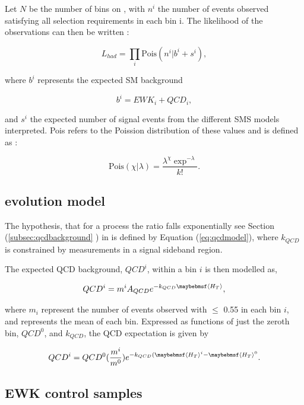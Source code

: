 Let $N$ be the number of bins on \theht, with $n^{i}$ the number of events observed satisfying all selection requirements in each \theht bin i. The likelihood of the observations can then be written :

\begin{equation}
L_{had} =   \prod_{i}\text{Pois}(n^{i}\rvert b^{i} + s^{i}),
\end{equation}

where $b^{i}$ represents the expected \ac{SM} background 

\begin{equation}
\label{eq:totbacksum}
b^{i} = EWK_{i} + QCD_{i},
\end{equation}

and $s^{i}$ the expected number of signal events from the different \ac{SMS} models interpreted. Pois refers to the Poission distribution of these values and is defined as :

\begin{equation}
\text{Pois}(\chi\rvert\lambda) = \frac{\lambda^{\chi}\exp^{-\lambda}}{k!}.
\end{equation}
 
\subsection{\theht evolution model}
\label{subsec:htevolution}

The hypothesis, that for a process the \alphat ratio falls exponentially see Section (\ref{subsec:qcdbackground} ) in \theht is defined by Equation (\ref{eq:qcdmodel}), where $k_{QCD}$ is constrained by measurements in a signal sideband region. 

The expected QCD background, $QCD^{i}$, within a bin $i$ is then modelled as,

\begin{equation}
QCD^{i} = m^{i}A_{QCD}e^{-k_{QCD}\meanht},
\end{equation}

where $m_{i}$ represent the number of events observed with \alphat $\leq$ 0.55 in each \theht bin $i$, and \meanht represents the mean \theht of each bin. Expressed as functions of just the zeroth bin, $QCD^{0}$, and $k_{QCD}$, the QCD expectation is given by

\begin{equation}
QCD^{i} = QCD^{0}(\frac{m^{i}}{m^{0}})e^{-k_{QCD}(\meanht^{i}-\meanht^{0}}.
\end{equation} 

\subsection{\ac{EWK} control samples}
\label{subsec:ewkmodel}

